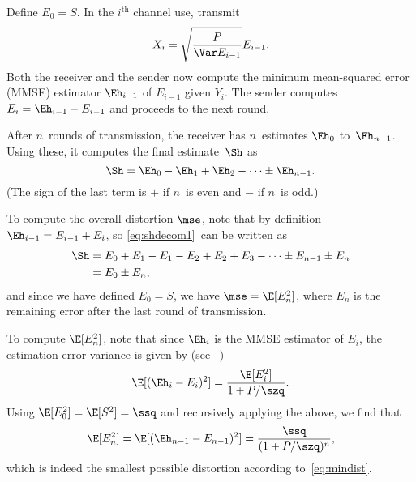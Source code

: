 \begin{example}
  \label{ex:gaussfb}
  Define $E_0 = S$. In the $i^{\text{th}}$ channel use, transmit
  \begin{equation}
    \label{eq:gaussfbxi}
    X_i = \sqrt{\frac{P}{\Var E_{i-1}}} E_{i-1}.
  \end{equation}
  Both the receiver and the sender now compute the minimum mean-squared
  error (MMSE) estimator $\Eh_{i-1}$ of $E_{i-1}$ given $Y_i$. The sender
  computes $E_i = \Eh_{i-1} - E_{i-1}$ and proceeds to the next round.

  After $n$~rounds of transmission, the receiver has $n$~estimates $\Eh_0$
  to~$\Eh_{n-1}$. Using these, it computes the final estimate~$\Sh$ as
  \begin{equation}
    \label{eq:shdecom1}
    \Sh = \Eh_0 - \Eh_1 + \Eh_2 - \cdots \pm \Eh_{n-1}.
  \end{equation}
  (The sign of the last term is $+$ if $n$~is even and $-$ if $n$~is odd.)

  To compute the overall distortion $\mse$, note that by definition $\Eh_{i-1} =
  E_{i-1} + E_i$, so \eqref{eq:shdecom1}~can be written as
  \begin{align*}
    \Sh &= E_0 + E_1 - E_1 - E_2 + E_2 + E_3 - \cdots \pm E_{n-1} \pm E_n \\
    &= E_0 \pm E_n,
  \end{align*}
  and since we have defined $E_0 = S$, we have $\mse = \E[E_n^2]$, where $E_n$
  is the remaining error after the last round of transmission.

  To compute $\E[E_n^2]$, note that since $\Eh_i$ is the MMSE estimator of
  $E_i$, the estimation error variance is given by (see
  \eg~\cite[Section~8.3]{Scharf1990})
  \begin{equation}
    \label{eq:gaussvardec}
    \E[(\Eh_i - E_i)^2] = \frac{\E[E_i^2]}{1 + P/\szq}.
  \end{equation}
  Using $\E[E_0^2] = \E[S^2] = \ssq$ and recursively applying the above, we find
  that
  \begin{equation*}
    \E[E_n^2] = \E[(\Eh_{n-1} - E_{n-1})^2] = \frac{\ssq}{(1 + P/\szq)^n},
  \end{equation*}
  which is indeed the smallest possible distortion according
  to~\eqref{eq:mindist}.
\end{example}

